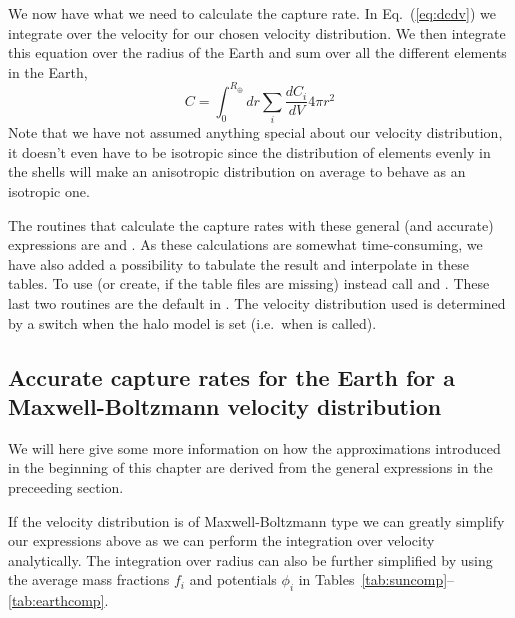 We now have what we need to calculate the capture rate. In
Eq.~(\ref{eq:dcdv}) we integrate over the velocity for our chosen
velocity distribution. We then integrate this equation over the radius
of the Earth and sum over all the different elements in the Earth, 
\begin{equation}
\label{ }
   C = \int_0^{R_\oplus} dr \sum_i \frac{dC_i}{dV} 4 \pi r^2
\end{equation}
Note that we have not assumed anything special about our velocity
distribution, it doesn't even have to be isotropic since the
distribution of elements evenly in the shells will make an anisotropic
distribution on average to behave as an isotropic one. 

The routines that calculate the capture rates with these general (and
accurate) expressions are  and
. As these calculations are somewhat
time-consuming, we have also added a possibility to tabulate the
result and interpolate in these tables. To use (or create, if the
table files are missing) instead call  and
. These last two routines are the default in
\ds. The velocity distribution used is determined by a switch when the
halo model is set (i.e.\ when  is called).


\subsection{Accurate capture rates for the Earth for a
  Maxwell-Boltzmann velocity distribution}

We will here give some more information on how the approximations
introduced in the beginning of this chapter are derived from the
general expressions in the preceeding section.

If the velocity distribution is of Maxwell-Boltzmann type we can
greatly simplify our expressions above as we can perform the
integration over velocity analytically. The integration over radius
can also be further simplified by using the average mass fractions
$f_i$ and potentials $\phi_i$ in Tables~\ref{tab:suncomp}--\ref{tab:earthcomp}. 

